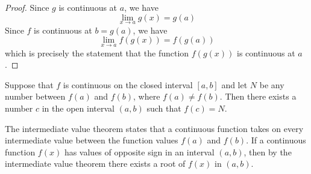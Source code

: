 \begin{proof}
    Since \(g\) is continuous at \(a\),
    we have
    \[\lim_{x\to a}g(x)=g(a)\]
    Since \(f\) is continuous at \(b=g(a)\),
    we have
    \[\lim_{x\to a}f(g(x))=f(g(a))\]
    which is precisely the statement that the function \(f(g(x))\) is
    continuous at \(a\).
\end{proof}
\begin{theorem}
    Suppose that \(f\) is continuous on the closed interval \([a,b]\) and let
    \(N\) be any number between \(f(a)\) and \(f(b)\),
    where \(f(a)\neq f(b)\).
    Then there exists a number \(c\) in the open interval \((a,b)\) such that
    \(f(c)=N\).
\end{theorem}
The intermediate value theorem states that a continuous function takes on
every intermediate value between the function values \(f(a)\) and \(f(b)\).
If a continuous function \(f(x)\) has values of opposite sign in an interval
\((a,b)\),
then by the intermediate value theorem there exists a root of \(f(x)\) in \((a,b)\).